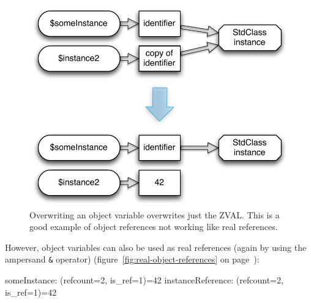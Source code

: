 
\begin{figure}[!h]
  \begin{center}
    \includegraphics[scale=0.8]{images/someInstance_instance2}
    \caption{Overwriting an object variable overwrites just the ZVAL. This is a good example of object references not working like real references.}
    \label{fig:false-object-references}
  \end{center}
\end{figure}

However, object variables can also be used as real references (again by using the ampersand \texttt{\&} operator) (figure~\ref{fig:real-object-references} on page~\pageref{fig:real-object-references}):


\begin{textcode}
someInstance: (refcount=2, is_ref=1)=42
instanceReference: (refcount=2, is_ref=1)=42
\end{textcode}

